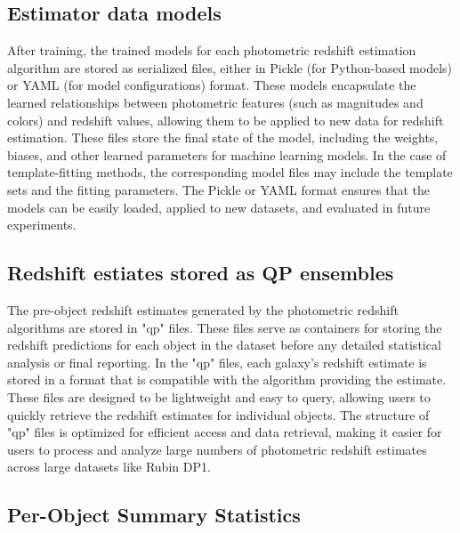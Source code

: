 

\subsection{Estimator data models}
\label{sec: products:models}

After training, the trained models for each photometric redshift estimation algorithm are stored as serialized files, either in Pickle (for Python-based models) or YAML (for model configurations) format.  These models encapsulate the learned relationships between photometric features (such as magnitudes and colors) and redshift values, allowing them to be applied to new data for redshift estimation.  These files store the final state of the model, including the weights, biases, and other learned parameters for machine learning models.  In the case of template-fitting methods, the corresponding model files may include the template sets and the fitting parameters.  The Pickle or YAML format ensures that the models can be easily loaded, applied to new datasets, and evaluated in future experiments.


\subsection{Redshift estiates stored as QP ensembles}
\label{sec: products:qp_ensembles}

The pre-object redshift estimates generated by the photometric redshift algorithms are stored in "qp" files.  These files serve as containers for storing the redshift predictions for each object in the dataset before any detailed statistical analysis or final reporting.  In the "qp" files, each galaxy’s redshift estimate is stored in a format that is compatible with the algorithm providing the estimate.  These files are designed to be lightweight and easy to query, allowing users to quickly retrieve the redshift estimates for individual objects.  The structure of "qp" files is optimized for efficient access and data retrieval, making it easier for users to process and analyze large numbers of photometric redshift estimates across large datasets like Rubin DP1.



\subsection{Per-Object Summary Statistics}
\label{sec: products:summary_statistics}

